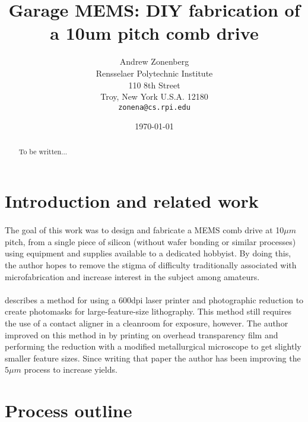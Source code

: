 \documentclass[twocolumn]{article}
\begin{document}
\title{Garage MEMS: DIY fabrication of a 10um pitch comb drive}
\author{Andrew Zonenberg\\
	Rensselaer Polytechnic Institute\\
	110 8th Street\\
	Troy, New York U.S.A. 12180\\
	\texttt{zonena@cs.rpi.edu}}
\date{\today}
\maketitle

\begin{abstract}
\paragraph*{}
To be written...
\end{abstract}

\section{Introduction and related work}
\paragraph*{}
The goal of this work was to design and fabricate a MEMS comb drive at 10$\mu m$ pitch, from a
single piece of silicon (without wafer bonding or similar processes) using equipment and supplies
available to a dedicated hobbyist. By doing this, the author hopes to remove the stigma of
difficulty traditionally associated with microfabrication and increase interest in the subject
among amateurs.

\paragraph*{}
\cite{OfficePrint} describes a method for using a 600dpi laser printer and photographic reduction to
create photomasks for large-feature-size lithography. This method still requires the use of a
contact aligner in a cleanroom for exposure, however. The author improved on this method in
\cite{DiyFab} by printing on overhead transparency film and performing the reduction with a
modified metallurgical microscope to get slightly smaller feature sizes. Since writing that paper
the author has been improving the $5 \mu m$ process to increase yields.

\section{Process outline}
\end{document}
